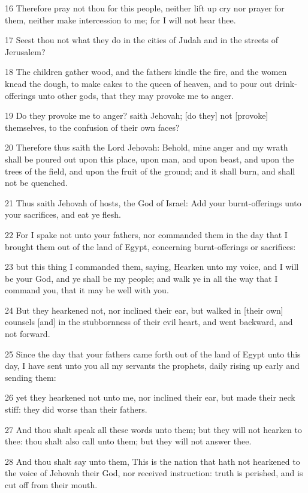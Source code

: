 \par 16 Therefore pray not thou for this people, neither lift up cry nor prayer for them, neither make intercession to me; for I will not hear thee.
\par 17 Seest thou not what they do in the cities of Judah and in the streets of Jerusalem?
\par 18 The children gather wood, and the fathers kindle the fire, and the women knead the dough, to make cakes to the queen of heaven, and to pour out drink-offerings unto other gods, that they may provoke me to anger.
\par 19 Do they provoke me to anger? saith Jehovah; [do they] not [provoke] themselves, to the confusion of their own faces?
\par 20 Therefore thus saith the Lord Jehovah: Behold, mine anger and my wrath shall be poured out upon this place, upon man, and upon beast, and upon the trees of the field, and upon the fruit of the ground; and it shall burn, and shall not be quenched.
\par 21 Thus saith Jehovah of hosts, the God of Israel: Add your burnt-offerings unto your sacrifices, and eat ye flesh.
\par 22 For I spake not unto your fathers, nor commanded them in the day that I brought them out of the land of Egypt, concerning burnt-offerings or sacrifices:
\par 23 but this thing I commanded them, saying, Hearken unto my voice, and I will be your God, and ye shall be my people; and walk ye in all the way that I command you, that it may be well with you.
\par 24 But they hearkened not, nor inclined their ear, but walked in [their own] counsels [and] in the stubbornness of their evil heart, and went backward, and not forward.
\par 25 Since the day that your fathers came forth out of the land of Egypt unto this day, I have sent unto you all my servants the prophets, daily rising up early and sending them:
\par 26 yet they hearkened not unto me, nor inclined their ear, but made their neck stiff: they did worse than their fathers.
\par 27 And thou shalt speak all these words unto them; but they will not hearken to thee: thou shalt also call unto them; but they will not answer thee.
\par 28 And thou shalt say unto them, This is the nation that hath not hearkened to the voice of Jehovah their God, nor received instruction: truth is perished, and is cut off from their mouth.
